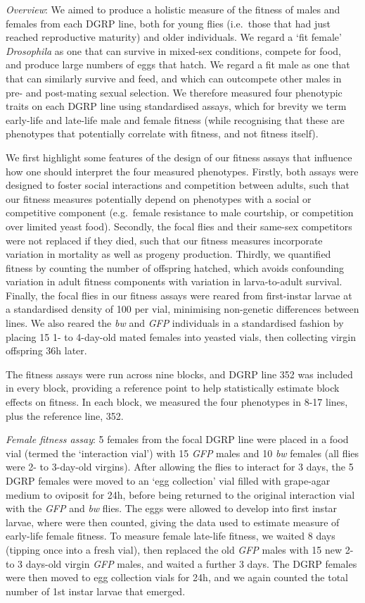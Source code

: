 \documentclass{article}
\begin{document}
\emph{Overview}: We aimed to produce a holistic measure of the fitness
of males and females from each DGRP line, both for young flies
(i.e.~those that had just reached reproductive maturity) and older
individuals. We regard a `fit female' \emph{Drosophila} as one that can
survive in mixed-sex conditions, compete for food, and produce large
numbers of eggs that hatch. We regard a fit male as one that that can
similarly survive and feed, and which can outcompete other males in pre-
and post-mating sexual selection. We therefore measured four phenotypic
traits on each DGRP line using standardised assays, which for brevity we
term early-life and late-life male and female fitness (while recognising
that these are phenotypes that potentially correlate with fitness, and
not fitness itself).

We first highlight some features of the design of our fitness assays
that influence how one should interpret the four measured phenotypes.
Firstly, both assays were designed to foster social interactions and
competition between adults, such that our fitness measures potentially
depend on phenotypes with a social or competitive component (e.g.~female
resistance to male courtship, or competition over limited yeast food).
Secondly, the focal flies and their same-sex competitors were not
replaced if they died, such that our fitness measures incorporate
variation in mortality as well as progeny production. Thirdly, we
quantified fitness by counting the number of offspring hatched, which
avoids confounding variation in adult fitness components with variation
in larva-to-adult survival. Finally, the focal flies in our fitness
assays were reared from first-instar larvae at a standardised density of
100 per vial, minimising non-genetic differences between lines. We also
reared the \emph{bw} and \emph{GFP} individuals in a standardised
fashion by placing 15 1- to 4-day-old mated females into yeasted vials,
then collecting virgin offspring 36h later.

The fitness assays were run across nine blocks, and DGRP line 352 was
included in every block, providing a reference point to help
statistically estimate block effects on fitness. In each block, we
measured the four phenotypes in 8-17 lines, plus the reference line,
352.

\emph{Female fitness assay}: 5 females from the focal DGRP line were
placed in a food vial (termed the `interaction vial') with 15 \emph{GFP}
males and 10 \emph{bw} females (all flies were 2- to 3-day-old virgins).
After allowing the flies to interact for 3 days, the 5 DGRP females were
moved to an `egg collection' vial filled with grape-agar medium to
oviposit for 24h, before being returned to the original interaction vial
with the \emph{GFP} and \emph{bw} flies. The eggs were allowed to
develop into first instar larvae, where were then counted, giving the
data used to estimate measure of early-life female fitness. To measure
female late-life fitness, we waited 8 days (tipping once into a fresh
vial), then replaced the old \emph{GFP} males with 15 new 2- to 3
days-old virgin \emph{GFP} males, and waited a further 3 days. The DGRP
females were then moved to egg collection vials for 24h, and we again
counted the total number of 1st instar larvae that emerged.
\end{document}
